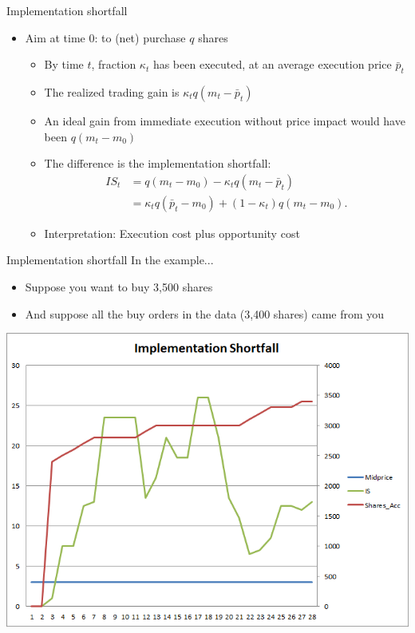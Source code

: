 \documentclass[english,10pt
,aspectratio=169
]{beamer}
\begin{document}
\begin{frame}{Implementation shortfall}
	\begin{itemize}
		\item Aim at time 0: to (net) purchase $q$ shares
		\begin{itemize}
			\item By time $t$, fraction $\kappa_t$ has been executed, at an average execution price $\bar{p}_t$
			\item The realized trading gain is $\kappa_t q(m_t-\bar{p}_t)$
			\item An ideal gain from immediate execution without price impact would have been $q(m_t - m_0)$
			\item The difference is the \alert{implementation shortfall}:
			\begin{align*}
			IS_t 
			& = q(m_t-m_0) - \kappa_t q (m_t - \bar{p}_t) \\
			& = \kappa_t q(\bar{p}_t - m_0) + (1-\kappa_t) q (m_t - m_0).
			\end{align*}
			\item Interpretation: Execution cost plus opportunity cost
		\end{itemize}
	\end{itemize}
\end{frame}


\begin{frame}{Implementation shortfall}
	In the example... 
	\begin{itemize}
		\item Suppose you want to buy 3,500 shares
		\item And suppose all the buy orders in the data (3,400 shares) came from you
	\end{itemize}
	\center
	\includegraphics[scale=0.39]{pics/L2_is}
\end{frame}
\end{document}
